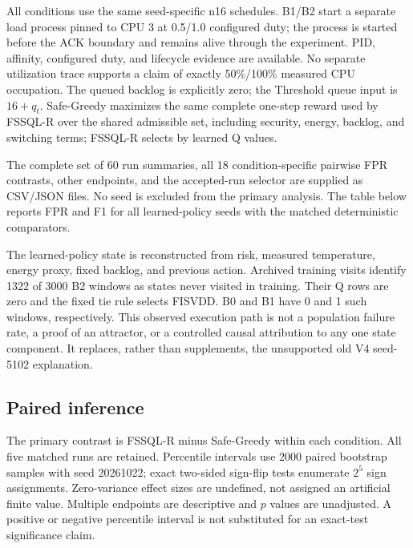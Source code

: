 \documentclass[journal]{IEEEtran}
\begin{document}
All conditions use the same seed-specific n16 schedules. B1/B2 start a separate load process pinned to CPU 3 at 0.5/1.0 configured duty; the process is started before the ACK boundary and remains alive through the experiment. PID, affinity, configured duty, and lifecycle evidence are available. No separate utilization trace supports a claim of exactly 50\%/100\% measured CPU occupation. The queued backlog is explicitly zero; the Threshold queue input is $16+q_t$. Safe-Greedy maximizes the same complete one-step reward used by FSSQL-R over the shared admissible set, including security, energy, backlog, and switching terms; FSSQL-R selects by learned Q values.

The complete set of 60 run summaries, all 18 condition-specific pairwise FPR contrasts, other endpoints, and the accepted-run selector are supplied as CSV/JSON files. No seed is excluded from the primary analysis. The table below reports FPR and F1 for all learned-policy seeds with the matched deterministic comparators.


The learned-policy state is reconstructed from risk, measured temperature, energy proxy, fixed backlog, and previous action. Archived training visits identify 1322 of 3000 B2 windows as states never visited in training. Their Q rows are zero and the fixed tie rule selects FISVDD. B0 and B1 have 0 and 1 such windows, respectively. This observed execution path is not a population failure rate, a proof of an attractor, or a controlled causal attribution to any one state component. It replaces, rather than supplements, the unsupported old V4 seed-5102 explanation.

\subsection{Paired inference}
The primary contrast is FSSQL-R minus Safe-Greedy within each condition. All five matched runs are retained. Percentile intervals use 2000 paired bootstrap samples with seed 20261022; exact two-sided sign-flip tests enumerate $2^5$ sign assignments. Zero-variance effect sizes are undefined, not assigned an artificial finite value. Multiple endpoints are descriptive and $p$ values are unadjusted. A positive or negative percentile interval is not substituted for an exact-test significance claim.


\end{document}
